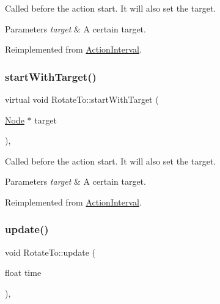 Called before the action start. It will also set the target.


\begin{DoxyParams}{Parameters}
{\em target} & A certain target. \\
\hline
\end{DoxyParams}


Reimplemented from \hyperlink{classActionInterval_ad3d91186b2c3108488ddbbdbbd982484}{Action\+Interval}.

\mbox{\label{classRotateTo_aa09f9ac166119be0fa34d3a97261fc3a}} 
\subsubsection{\texorpdfstring{start\+With\+Target()}{startWithTarget()}\hspace{0.1cm}{\footnotesize\ttfamily [2/2]}}
{\footnotesize\ttfamily virtual void Rotate\+To\+::start\+With\+Target (\begin{DoxyParamCaption}\item[{\hyperlink{classNode}{Node} $\ast$}]{target }\end{DoxyParamCaption})\hspace{0.3cm}{\ttfamily [override]}, {\ttfamily [virtual]}}

Called before the action start. It will also set the target.


\begin{DoxyParams}{Parameters}
{\em target} & A certain target. \\
\hline
\end{DoxyParams}


Reimplemented from \hyperlink{classActionInterval_ad3d91186b2c3108488ddbbdbbd982484}{Action\+Interval}.

\mbox{\label{classRotateTo_a2373d42f88a808956eacc7c50c1121c1}} 
\subsubsection{\texorpdfstring{update()}{update()}\hspace{0.1cm}{\footnotesize\ttfamily [1/2]}}
{\footnotesize\ttfamily void Rotate\+To\+::update (\begin{DoxyParamCaption}\item[{float}]{time }\end{DoxyParamCaption})\hspace{0.3cm}{\ttfamily [override]}, {\ttfamily [virtual]}}


